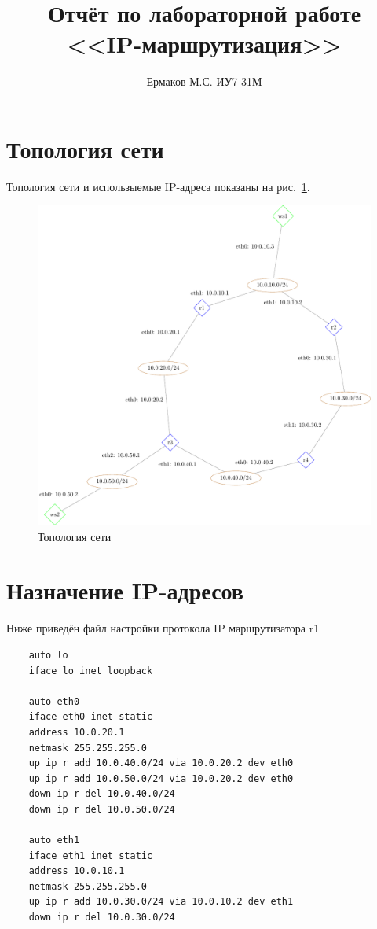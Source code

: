 \documentclass[a4paper,12pt]{article}
\title{Отчёт по лабораторной работе \\ <<IP-маршрутизация>>}
\author{Ермаков М.С. ИУ7-31М}
\begin{document}
\maketitle

\tableofcontents


\section{Топология сети}

Топология сети и использыемые IP-адреса показаны на рис.~\ref{fig:network}.

\begin{figure}
\centering
\includegraphics[width=\textwidth]{includes/network_gv.pdf}
\caption{Топология сети}
\label{fig:network}
\end{figure}


\section{Назначение IP-адресов}

Ниже приведён файл настройки протокола IP маршрутизатора r1

\begin{Verbatim}
    auto lo
    iface lo inet loopback
    
    auto eth0
    iface eth0 inet static
    address 10.0.20.1
    netmask 255.255.255.0
    up ip r add 10.0.40.0/24 via 10.0.20.2 dev eth0
    up ip r add 10.0.50.0/24 via 10.0.20.2 dev eth0
    down ip r del 10.0.40.0/24
    down ip r del 10.0.50.0/24
    
    auto eth1
    iface eth1 inet static
    address 10.0.10.1
    netmask 255.255.255.0
    up ip r add 10.0.30.0/24 via 10.0.10.2 dev eth1
    down ip r del 10.0.30.0/24
\end{Verbatim}
\end{document}
